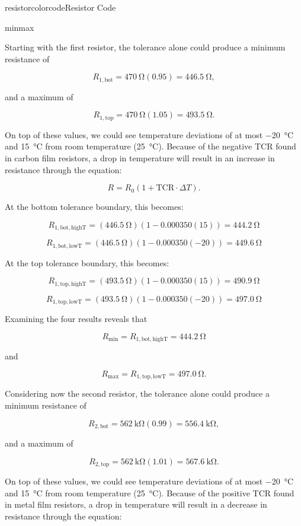 \begin{mainquestion}{resistorcolorcode}{Resistor Code}
\begin{partquestion}{minmax}
\begin{answer}
Starting with the first resistor, the tolerance alone could produce a minimum resistance of

\[
R_{1,\mathrm{bot}}
=
\qty{470}{\ohm}\left(0.95\right)
=
\qty{446.5}{\ohm},
\]

and a maximum of

\[
R_{1,\mathrm{top}}
=
\qty{470}{\ohm}\left(1.05\right)
=
\qty{493.5}{\ohm}.
\]

On top of these values, we could see temperature deviations of at most \qty{-20}{\celsius} and \qty{15}{\celsius} from room temperature (\qty{25}{\celsius}). Because of the negative TCR found in carbon film resistors, a drop in temperature will result in an increase in resistance through the equation:

\[
R=R_0\left(1+\mathrm{TCR}\cdot\Delta T\right).
\]

At the bottom tolerance boundary, this becomes:

\[
R_{1,\mathrm{bot,highT}}
=
\left(\qty{446.5}{\ohm}\right)
\left(1-0.000350\left(15\right)\right)
=
\qty{444.2}{\ohm}
\]

\[
R_{1,\mathrm{bot,lowT}}
=
\left(\qty{446.5}{\ohm}\right)
\left(1-0.000350\left(-20\right)\right)
=
\qty{449.6}{\ohm}
\]

At the top tolerance boundary, this becomes:

\[
R_{1,\mathrm{top,highT}}
=
\left(\qty{493.5}{\ohm}\right)
\left(1-0.000350\left(15\right)\right)
=
\qty{490.9}{\ohm}
\]

\[
R_{1,\mathrm{top,lowT}}
=
\left(\qty{493.5}{\ohm}\right)
\left(1-0.000350\left(-20\right)\right)
=
\qty{497.0}{\ohm}
\]

Examining the four results reveals that

\[
R_{\mathrm{min}}
=
R_{1,\mathrm{bot,highT}}
=
\qty{444.2}{\ohm}
\]

and

\[
R_{\mathrm{max}}
=
R_{1,\mathrm{top,lowT}}
=
\qty{497.0}{\ohm}.
\]

Considering now the second resistor, the tolerance alone could produce a minimum resistance of

\[
R_{2,\mathrm{bot}}
=
\qty{562}{\kilo\ohm}\left(0.99\right)
=
\qty{556.4}{\kilo\ohm},
\]

and a maximum of

\[
R_{2,\mathrm{top}}
=
\qty{562}{\kilo\ohm}\left(1.01\right)
=
\qty{567.6}{\kilo\ohm}.
\]

On top of these values, we could see temperature deviations of at most \qty{-20}{\celsius} and \qty{15}{\celsius} from room temperature (\qty{25}{\celsius}). Because of the positive TCR found in metal film resistors, a drop in temperature will result in a decrease in resistance through the equation:


\end{answer}
\end{partquestion}
\end{mainquestion}
